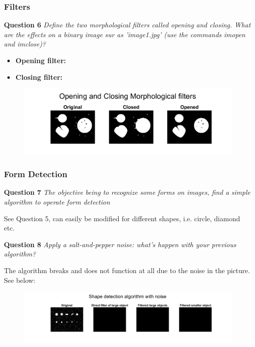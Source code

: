 \subsubsection{Filters}
\textbf{Question 6} \textit{Deﬁne the two morphological ﬁlters called opening and closing. What are the eﬀects on a binary image sur as ’image1.jpg’ (use the commands imopen and imclose)?}

\begin{itemize}
    \item \textbf{Opening filter:}

    \item  \textbf{Closing filter:}
    
\end{itemize}

\begin{figure}[H]
    \centering
    \includegraphics[width=0.75\linewidth]{Doc/Graphics/Part2/part2_Q6.png}
\end{figure}

\vfill
\subsubsection{Form Detection}
\textbf{Question 7} \textit{The objective being to recognize some forms on images, ﬁnd a simple algorithm to operate form detection}

See Question 5, can easily be modified for different shapes, i.e. circle, diamond etc.


\textbf{Question 8} \textit{Apply a salt-and-pepper noise: what’s happen with your previous algorithm?}

The algorithm breaks and does not function at all due to the noise in the picture. See below:

\begin{figure}[H]
    \centering
    \includegraphics[width=\linewidth]{Doc/Graphics/Part2/part2_Q8.png}
\end{figure}



